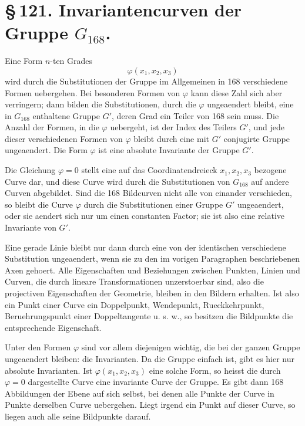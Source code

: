 \documentclass[11pt]{article}
\begin{document}
\section*{\S\,121. Invariantencurven der Gruppe \(G_{168}\).}

Eine Form \(n\)-ten Grades
\begin{equation}
\varphi(x_1,x_2,x_3)
\end{equation}
wird durch die Substitutionen der Gruppe im Allgemeinen in 168 verschiedene Formen uebergehen. Bei besonderen Formen von \(\varphi\) kann diese Zahl sich aber verringern; dann bilden die Substitutionen, durch die \(\varphi\) ungeaendert bleibt, eine in \(G_{168}\) enthaltene Gruppe \(G'\), deren Grad ein Teiler von 168 sein muss. Die Anzahl der Formen, in die \(\varphi\) uebergeht, ist der Index des Teilers \(G'\), und jede dieser verschiedenen Formen von \(\varphi\) bleibt durch eine mit \(G'\) conjugirte Gruppe ungeaendert. Die Form \(\varphi\) ist eine absolute Invariante der Gruppe \(G'\).

Die Gleichung \(\varphi=0\) stellt eine auf das Coordinatendreieck \(x_1,x_2,x_3\) bezogene Curve dar, und diese Curve wird durch die Substitutionen von \(G_{168}\) auf andere Curven abgebildet. Sind die 168 Bildcurven nicht alle von einander verschieden, so bleibt die Curve \(\varphi\) durch die Substitutionen einer Gruppe \(G'\) ungeaendert, oder sie aendert sich nur um einen constanten Factor; sie ist also eine relative Invariante von \(G'\).

Eine gerade Linie bleibt nur dann durch eine von der identischen verschiedene Substitution ungeaendert, wenn sie zu den im vorigen Paragraphen beschriebenen Axen gehoert. Alle Eigenschaften und Beziehungen zwischen Punkten, Linien und Curven, die durch lineare Transformationen unzerstoerbar sind, also die projectiven Eigenschaften der Geometrie, bleiben in den Bildern erhalten. Ist also ein Punkt einer Curve ein Doppelpunkt, Wendepunkt, Rueckkehrpunkt, Beruehrungspunkt einer Doppeltangente u. s. w., so besitzen die Bildpunkte die entsprechende Eigenschaft.

Unter den Formen \(\varphi\) sind vor allem diejenigen wichtig, die bei der ganzen Gruppe ungeaendert bleiben: die Invarianten. Da die Gruppe einfach ist, gibt es hier nur absolute Invarianten. Ist \(\varphi(x_1,x_2,x_3)\) eine solche Form, so heisst die durch \(\varphi=0\) dargestellte Curve eine invariante Curve der Gruppe. Es gibt dann 168 Abbildungen der Ebene auf sich selbst, bei denen alle Punkte der Curve in Punkte derselben Curve uebergehen. Liegt irgend ein Punkt auf dieser Curve, so liegen auch alle seine Bildpunkte darauf.
\end{document}
